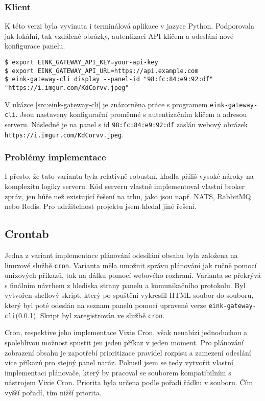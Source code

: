 \subsubsection{Klient}\label{eink-gateway-cli}
K této verzi byla vyvinuta i terminálová aplikace v jazyce Python. Podporovala jak lokální, tak vzdálené obrázky, autentizaci API klíčem a odeslání nové konfigurace panelu.

\begin{lstlisting}[label=src:eink-gateway-cli,caption={Ukázka programu eink-gateway-cli pro odeslání obrázku na panel}]
$ export EINK_GATEWAY_API_KEY=your-api-key
$ export EINK_GATEWAY_API_URL=https://api.example.com
$ eink-gateway-cli display --panel-id "98:fc:84:e9:92:df" "https://i.imgur.com/KdCorvv.jpeg"
\end{lstlisting}

V ukázce \ref{src:eink-gateway-cli} je znázorněna práce s programem \lstinline|eink-gateway-cli|. Jsou nastaveny konfigurační proměnné s autentizačním klíčem a adresou serveru. Následně je na panel s id \verb|98:fc:84:e9:92:df| zaslán webový obrázek \verb|https://i.imgur.com/KdCorvv.jpeg|.

\subsubsection{Problémy implementace}
I přesto, že tato varianta byla relativně robustní, kladla příliš vysoké nároky na komplexitu logiky serveru. Kód serveru vlastně implementoval vlastní broker zpráv, jen hůře než existující řešení na trhu, jako jsou např. NATS\cite{NATSIo}, RabbitMQ\cite{RabbitMQOneBroker} nebo Redis\cite{RedisRealtimeData}. Pro udržitelnost projektu jsem hledal jiné řešení.

\subsection{Crontab}
Jedna z variant implementace plánování odesílání obsahu byla založena na linuxové službě \lstinline|cron|. Varianta měla umožnit správu plánování jak ručně pomocí unixových příkazů, tak na dálku pomocí webového rozhraní. Varianta se překrývá s finálním návrhem z hlediska strany panelu a komunikačního protokolu. Byl vytvořen shellový skript, který po spuštění vykreslil HTML soubor do souboru, který byl poté odeslán na seznam panelů pomocí upravené verze \lstinline|eink-gateway-cli|(\ref{eink-gateway-cli}). Skript byl zaregistrován ve službě \lstinline|cron|.

Cron, respektive jeho implementace Vixie Cron, však nenabízí jednoduchou a spolehlivou možnost spustit jen jeden příkaz v jeden moment. Pro plánování zobrazení obsahu je zapotřebí prioritizace pravidel rozpisu a zamezení odeslání více příkazů pro stejný panel naráz. Pokusil jsem se tedy vytvořit vlastní implementaci plánovače, který by pracoval se souborem kompatibilním s nástrojem Vixie Cron. Priorita byla určena podle pořadí řádku v souboru. Čím vyšší pořadí, tím nižší priorita.

